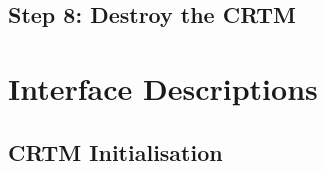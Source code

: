 \subsection{Step 8: Destroy the CRTM}



\section{Interface Descriptions}

\subsection{CRTM Initialisation}

